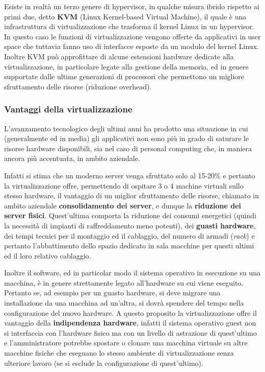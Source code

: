 \documentclass[italian,]{article}
\begin{document}
Esiste in realtà un terzo genere di hypervisor, in qualche misura ibrido
rispetto ai primi due, detto \textbf{KVM} (Linux Kernel-based Virtual
Machine), il quale è una infrastruttura di virtualizzazione che
trasforma il kernel Linux in un hypervisor. In questo caso le funzioni
di virtualizzazione vengono offerte da applicativi in user space che
tuttavia fanno uso di interfacce esposte da un modulo del kernel Linux.
Inoltre KVM può approfittare di alcune estensioni hardware dedicate alla
virtualizzazione, in particolare legate alla gestione della memoria, ed
in genere supportate dalle ultime generazioni di processori che
permettono un migliore sfruttamento delle risorse (riduzione overhead).

\subsubsection{Vantaggi della
virtualizzazione}\label{vantaggi-della-virtualizzazione}

L'avanzamento tecnologico degli ultimi anni ha prodotto una situazione
in cui (generalmente ed in media) gli applicativi non sono più in grado
di saturare le risorse hardware disponibili, sia nel caso di personal
computing che, in maniera ancora più accentuata, in ambito aziendale.

Infatti si stima che un moderno server venga sfruttato solo al 15-20\% e
pertanto la virtualizzazione offre, permettendo di ospitare 3 o 4
machine virtuali sullo stesso hardware, il vantaggio di un miglior
sfruttamento delle risorse, chiamato in ambito aziendale
\textbf{consolidamento dei server}, e dunque la \textbf{riduzione dei
server fisici}. Quest'ultima comporta la riduzione dei consumi
energetici (quindi la necessità di impianti di raffreddamento meno
potenti), dei \textbf{guasti hardware}, dei tempi tecnici per il
montaggio ed il cablaggio, del numero di armadi (\emph{rack}) e pertanto
l'abbattimento dello spazio dedicato in sala macchine per questi ultimi
ed il loro relativo cablaggio.

Inoltre il software, ed in particolar modo il sistema operativo in
esecuzione su una macchina, è in genere strettamente legato all'hardware
su cui viene eseguito. Pertanto se, ad esempio per un guasto hardware,
si deve migrare una installazione da una macchina ad un'altra, si dovrà
spendere del tempo nella configurazione del nuovo hardware. A questo
proposito la virtualizzazione offre il vantaggio della
\textbf{indipendenza hardware}, infatti il sistema operativo guest non
si interfaccia con l'hardware fisico ma con un livello di astrazione di
quest'ultimo e l'amministratore potrebbe spostare o clonare una macchina
virtuale su altre macchine fisiche che eseguano lo stesso ambiente di
virtualizzazione senza ulteriore lavoro (se si esclude la configurazione
di quest'ultimo).
\end{document}
